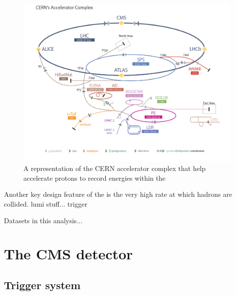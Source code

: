\begin{figure}
  \includegraphics[width=\largefigwidth]{figs/LHC_default}
  \caption[]%
  {A representation of the CERN accelerator complex that help
  accelerate protons to record energies within the \LHC
  \cite{stfc:lhc}}%
  \label{fig:lhc}
\end{figure}

Another key design feature of the \LHC is the very high rate at which
hadrons are collided. lumi stuff... trigger

Datasets in this analysis...

\cite{Evans:2008zzb} 


\section{The CMS detector}
\label{sec:cms}

\subsection{Trigger system}
\label{sec:triggers}

